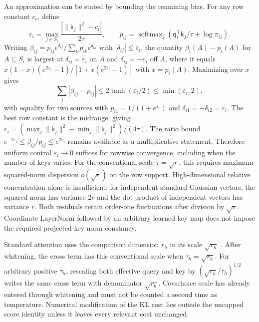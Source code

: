 \documentclass[twoside,11pt]{article}
\newcommand{\softmax}{\operatorname{softmax}}
\begin{document}
An approximation can be stated by bounding the remaining bias. For any row constant $c_i$, define
\begin{equation}
\varepsilon_i=\max_{j\in S_i}
\frac{|\|\mathsf k_j\|^2-c_i|}{2\tau},\qquad
p_{ij}=\softmax_j\left(\mathsf q_i^\top\mathsf k_j/\tau+\log\pi_{ij}\right).
\label{eq:projected_bias_error}
\end{equation}
Writing $\beta_{ij}=p_{ij}e^{\delta_{ij}}/\sum_kp_{ik}e^{\delta_{ik}}$ with $|\delta_{ij}|\le\varepsilon_i$, the quantity $\beta_i(A)-p_i(A)$ for $A\subseteq S_i$ is largest at $\delta_{ij}=\varepsilon_i$ on $A$ and $\delta_{ij}=-\varepsilon_i$ off $A$, where it equals $x(1-x)(e^{2\varepsilon_i}-1)/[1+x(e^{2\varepsilon_i}-1)]$ with $x=p_i(A)$. Maximizing over $x$ gives
\begin{equation}
\sum_j|\beta_{ij}-p_{ij}|\le2\tanh(\varepsilon_i/2)\le\min(\varepsilon_i,2),
\label{eq:projected_softmax_bound}
\end{equation}
with equality for two sources with $p_{i1}=1/(1+e^{\varepsilon_i})$ and $\delta_{i1}=-\delta_{i2}=\varepsilon_i$. The best row constant is the midrange, giving $\varepsilon_i=(\max_j\|\mathsf k_j\|^2-\min_j\|\mathsf k_j\|^2)/(4\tau)$. The ratio bound $e^{-2\varepsilon_i}\le\beta_{ij}/p_{ij}\le e^{2\varepsilon_i}$ remains available as a multiplicative statement.
Therefore uniform control $\varepsilon_i\to0$ suffices for rowwise convergence, including when the number of keys varies. For the conventional scale $\tau=\sqrt r$, this requires maximum squared-norm dispersion $o(\sqrt r)$ on the row support. High-dimensional relative concentration alone is insufficient: for independent standard Gaussian vectors, the squared norm has variance $2r$ and the dot product of independent vectors has variance $r$. Both residuals retain order-one fluctuations after division by $\sqrt r$. Coordinate LayerNorm followed by an arbitrary learned key map does not impose the required projected-key norm constancy.

Standard attention uses the comparison dimension \(r_h\) in its scale \(\sqrt{r_h}\) \citep[Sec.~3.2.1]{vaswani2017attention}. After whitening, the cross term has this conventional scale when \(\tau_h=\sqrt{r_h}\). For arbitrary positive \(\tau_h\), rescaling both effective query and key by \((\sqrt{r_h}/\tau_h)^{1/2}\) writes the same cross term with denominator \(\sqrt{r_h}\). Covariance scale has already entered through whitening and must not be counted a second time as temperature. Numerical modification of the KL cost lies outside the uncapped score identity unless it leaves every relevant cost unchanged.
\end{document}
